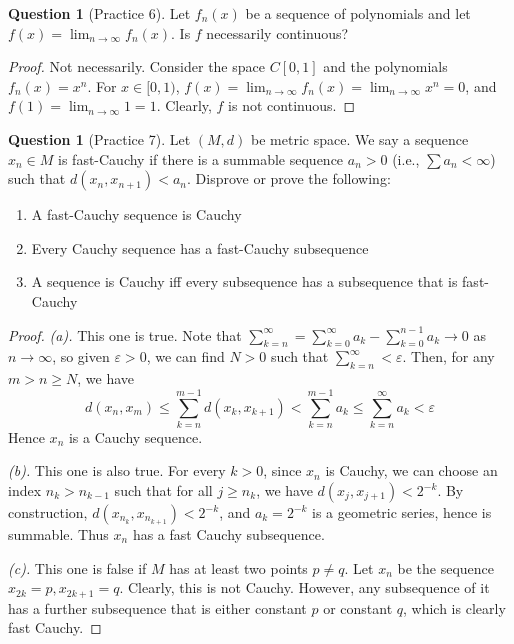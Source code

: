 \documentclass{article}
\theoremstyle{definition} %
\numberwithin{thm}{section} %
\theoremstyle{definition} %
\newtheorem{question}[thm]{Question}
\begin{document}
\begin{question}[Practice 6]
Let $f_n(x)$ be a sequence of polynomials and let $f(x) = \lim_{n \to \infty} f_n(x)$. Is $f$ necessarily continuous?
\end{question}
\begin{proof}
Not necessarily. Consider the space $C[0, 1]$ and the polynomials $f_n(x) = x^n$. For $x \in [0, 1)$, $f(x) = \lim_{n \to \infty} f_n(x) = \lim_{n \to \infty} x^n = 0$, and $f(1) = \lim_{n \to \infty} 1 = 1$. Clearly, $f$ is not continuous.
\end{proof}

\begin{question}[Practice 7]
Let $(M, d)$ be metric space. We say a sequence $x_n \in M$ is fast-Cauchy if there is a summable sequence $a_n > 0$ (i.e., $\sum a_n < \infty$) such that $d(x_n, x_{n+1}) < a_n$. Disprove or prove the following:
\begin{enumerate}[label=(\alph*)]
    \item A fast-Cauchy sequence is Cauchy
    \item Every Cauchy sequence has a fast-Cauchy subsequence
    \item A sequence is Cauchy iff every subsequence has a subsequence that is fast-Cauchy
\end{enumerate}
\end{question}
\begin{proof}
\textit{(a).} This one is true. Note that $\sum_{k = n}^\infty = \sum_{k = 0}^\infty a_k - \sum_{k = 0}^{n - 1} a_k \to 0$ as $n \to \infty$, so given $\varepsilon > 0$, we can find $N > 0$ such that $\sum_{k = n}^\infty < \varepsilon$. Then, for any $m > n \geq N$, we have 
\[ d(x_n, x_m) \leq \sum_{k = n}^{m - 1} d(x_k, x_{k + 1}) < \sum_{k = n}^{m - 1} a_k \leq \sum_{k = n}^\infty a_k < \varepsilon \]
Hence $x_n$ is a Cauchy sequence.

\textit{(b).} This one is also true. For every $k > 0$, since $x_n$ is Cauchy, we can choose an index $n_k > n_{k - 1}$ such that for all $j \geq n_k$, we have $d(x_j, x_{j + 1}) < 2^{-k}$. By construction, $d(x_{n_k}, x_{n_{k + 1}}) < 2^{-k}$, and $a_k = 2^{-k}$ is a geometric series, hence is summable. Thus $x_n$ has a fast Cauchy subsequence.

\textit{(c).} This one is false if $M$ has at least two points $p \neq q$. Let $x_n$ be the sequence $x_{2k} = p, x_{2k + 1} = q$. Clearly, this is not Cauchy. However, any subsequence of it has a further subsequence that is either constant $p$ or constant $q$, which is clearly fast Cauchy.
\end{proof}
\end{document}
